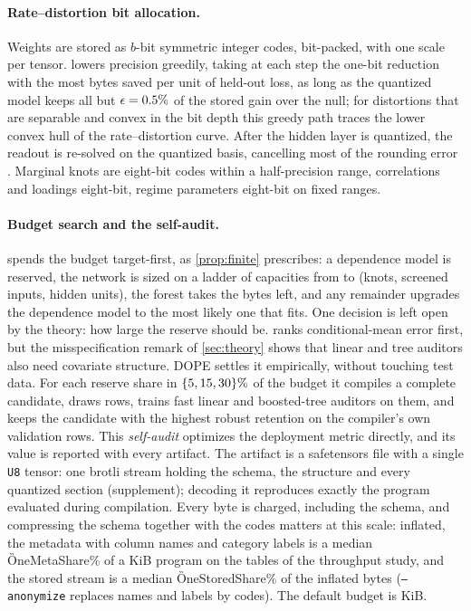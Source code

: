\paragraph{Rate--distortion bit allocation.}
Weights are stored as $b$-bit symmetric integer codes, bit-packed, with one scale per tensor.
 lowers precision greedily, taking at each step the one-bit reduction with the most
bytes saved per unit of held-out loss, as long as the quantized model keeps all but
$\epsilon=0.5\%$ of the stored gain over the null; for distortions that are separable and
convex in the bit depth this greedy path traces the lower convex hull of the rate--distortion curve.
After the hidden layer is quantized, the readout is re-solved on the quantized basis, cancelling most
of the rounding error \citep[an exact form of error feedback;][]{frantar2023gptq}. Marginal knots are eight-bit codes within a half-precision range,
correlations and loadings eight-bit, regime parameters eight-bit on fixed ranges.

\paragraph{Budget search and the self-audit.}
 spends the budget target-first, as \cref{prop:finite} prescribes: a dependence
model is reserved, the network is sized on a ladder of \CfgPlans{} capacities from \CfgPlanRich{}
to \CfgPlanLean{} (knots, screened inputs, hidden units), the forest takes the bytes left, and any
remainder upgrades the dependence model to the most likely one that fits. One decision is left open
by the theory: how large the reserve should be.  ranks conditional-mean error first,
but the misspecification remark of \cref{sec:theory} shows that linear and tree auditors also need
covariate structure. DOPE
settles it empirically, without touching test data. For each reserve share in
$\{5, 15, 30\}\%$ of the budget it compiles a complete candidate, draws \CfgAuditRows{} rows, trains
fast linear and boosted-tree auditors on them, and keeps the candidate with the highest robust
retention on the compiler's own validation rows. This \emph{self-audit} optimizes the deployment
metric directly, and its value is reported with every artifact. The artifact is a safetensors file with a
single \texttt{U8} tensor: one brotli stream \citep{alakuijala2016brotli} holding the schema, the
structure and every quantized section (supplement); decoding it reproduces exactly the program
evaluated during compilation. Every byte is charged, including the schema, and compressing the schema
together with the codes matters at this scale: inflated, the metadata with column names and category
labels is a median \G{OneMetaShare}\% of a \CfgBudget{} KiB program on the tables of the throughput
study, and the stored stream is a median \G{OneStoredShare}\% of the inflated bytes
(\texttt{--anonymize} replaces names and labels by codes). The default budget is \CfgBudget{} KiB.

